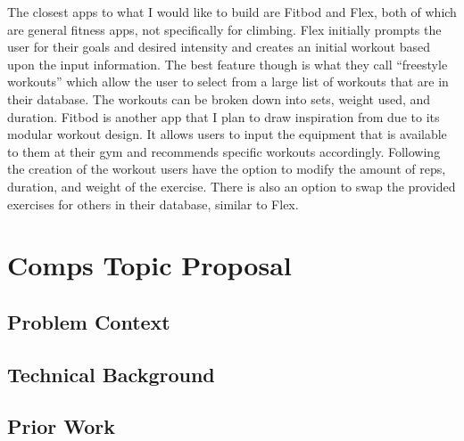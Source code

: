 \documentclass[10pt,twocolumn]{article}
\begin{document}
	The closest apps to what I would like to build are Fitbod and Flex, both of which are general fitness apps, not specifically for climbing. Flex initially prompts the user for their goals and desired intensity and creates an initial workout based upon the input information. The best feature though is what they call “freestyle workouts” which allow the user to select from a large list of workouts that are in their database. The workouts can be broken down into sets, weight used, and duration. Fitbod is another app that I plan to draw inspiration from due to its modular workout design. It allows users to input the equipment that is available to them at their gym and recommends specific workouts accordingly. Following the creation of the workout users have the option to modify the amount of reps, duration, and weight of the exercise. There is also an option to swap the provided exercises for others in their database, similar to Flex.

\section{Comps Topic Proposal}

\subsection{Problem Context}

\subsection{Technical Background}

\subsection{Prior Work}	
\end{document}
